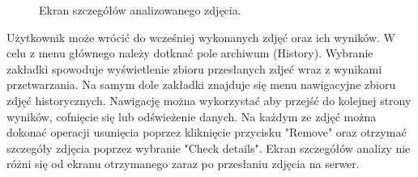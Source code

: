 {	
\begin{figure}[ht]
	\centering
	\quad
	\caption{Ekran szczegółów analizowanego zdjęcia.}
	\label{fig:uploadView}
\end{figure}

Użytkownik może wrócić do wcześniej wykonanych zdjęć oraz ich wyników. W celu z menu głównego należy dotknać pole archiwum (History). Wybranie zakładki spowoduje wyświetlenie zbioru przesłanych zdjeć wraz z wynikami przetwarzania. Na samym dole zakładki znajduje się menu nawigacyjne zbioru zdjęć historycznych. Nawigację można wykorzystać aby przejść do kolejnej strony wyników, cofnięcie się lub odświeżenie danych. Na każdym ze zdjęć można dokonać operacji usunięcia poprzez kliknięcie przycisku "Remove" oraz otrzymać szczegóły zdjęcia poprzez wybranie "Check details". Ekran szczegółów analizy nie różni się od ekranu otrzymanego zaraz po przesłaniu zdjęcia na serwer. 

}
